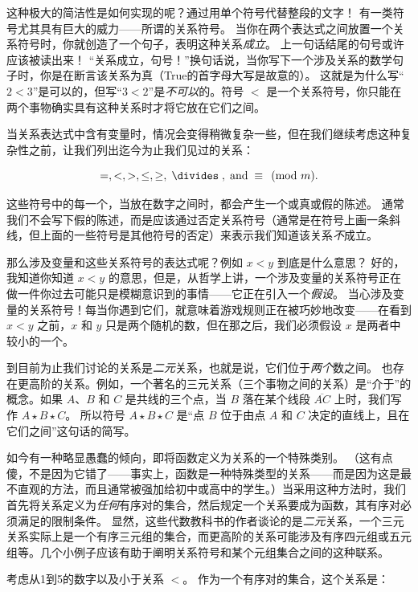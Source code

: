 这种极大的简洁性是如何实现的呢？通过用单个符号代替整段的文字！
有一类符号尤其具有巨大的威力——所谓的关系符号。
当你在两个表达式之间放置一个关系符号时，你就创造了一个句子，表明这种关系\emph{成立}。
上一句话结尾的句号或许应该被读出来！
“关系成立，句号！”换句话说，当你写下一个涉及关系的数学句子时，你是在断言该关系为真（True的首字母大写是故意的）。
这就是为什么写“$2 < 3$”是可以的，但写“$3 < 2$”是\emph{不可以}的。符号 $<$ 是一个关系符号，你只能在两个事物确实具有这种关系时才将它放在它们之间。

当关系表达式中含有变量时，情况会变得稍微复杂一些，但在我们继续考虑这种复杂性之前，让我们列出迄今为止我们见过的关系：

\[ =, <, >, \leq, \geq,\; \divides \; , \; \mbox{and} \; \equiv \pmod{m}. \]

这些符号中的每一个，当放在数字之间时，都会产生一个或真或假的陈述。
通常我们不会写下假的陈述，而是应该通过否定关系符号（通常是在符号上画一条斜线，但上面的一些符号是其他符号的否定）来表示我们知道该关系\emph{不}成立。

那么涉及变量和这些关系符号的表达式呢？例如 $x < y$ 到底是什么意思？
好的，我知道你知道 $x < y$ 的意思，但是，从哲学上讲，一个涉及变量的关系符号正在做一件你过去可能只是模糊意识到的事情——它正在引入一个\emph{假设}。
当心涉及变量的关系符号！每当你遇到它们，就意味着游戏规则正在被巧妙地改变——在看到 $x < y$ 之前，$x$ 和 $y$ 只是两个随机的数，但在那之后，我们必须假设 $x$ 是两者中较小的一个。

到目前为止我们讨论的关系是\emph{二元}关系，也就是说，它们位于\emph{两个}数之间。
也存在更高阶的关系。例如，一个著名的三元关系（三个事物之间的关系）是“介于”的概念。如果 $A$、$B$ 和 $C$ 是共线的三个点，当 $B$ 落在某个线段 $\overline{AC}$ 上时，我们写作 $A\star B \star C$。
所以符号 $A\star B \star C$ 是“点 $B$ 位于由点 $A$ 和 $C$ 决定的直线上，且在它们之间”这句话的简写。

如今有一种略显愚蠢的倾向，即将函数定义为关系的一个特殊类别。
（这有点傻，不是因为它错了——事实上，函数是一种特殊类型的关系——而是因为这是最不直观的方法，而且通常被强加给初中或高中的学生。）当采用这种方法时，我们首先将关系定义为\emph{任何}有序对的集合，然后规定一个关系要成为函数，其有序对必须满足的限制条件。
显然，这些代数教科书的作者谈论的是\emph{二元}关系，一个三元关系实际上是一个有序三元组的集合，而更高阶的关系可能涉及有序四元组或五元组等。几个小例子应该有助于阐明关系符号和某个元组集合之间的这种联系。

考虑从1到5的数字以及小于关系 $<$。
作为一个有序对的集合，这个关系是：

